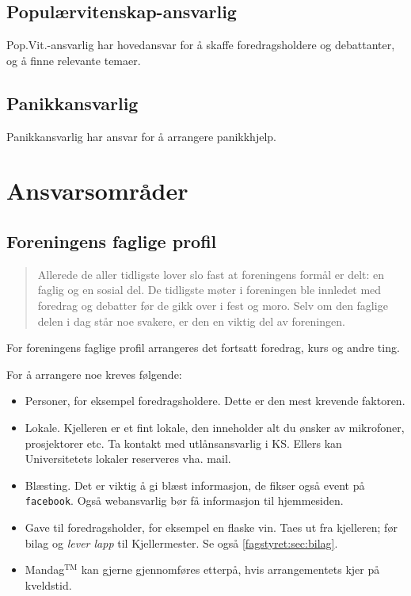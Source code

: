\subsection{Populærvitenskap-ansvarlig}
Pop.Vit.-ansvarlig har hovedansvar for å skaffe foredragsholdere og debattanter,
og å finne relevante temaer.

\subsection{Panikkansvarlig}
Panikkansvarlig har ansvar for å arrangere panikkhjelp.

\section{Ansvarsområder}
\subsection{Foreningens faglige profil}
\begin{quote}
	Allerede de aller tidligste lover slo fast at foreningens formål er delt: en
	faglig og en sosial del. De tidligste møter i foreningen ble innledet
	med foredrag og debatter før de gikk over i fest og moro. Selv om den
	faglige delen i dag står noe svakere, er den en viktig del av
	foreningen.
\end{quote}

For foreningens faglige profil arrangeres det fortsatt foredrag, kurs og andre
ting.

For å arrangere noe kreves følgende:
\begin{itemize}
	\item Personer, for eksempel foredragsholdere. Dette er den mest
	krevende faktoren.
	\item Lokale. 
          Kjelleren er et fint lokale, den inneholder alt du ønsker av
          mikrofoner, prosjektorer etc. Ta kontakt med utlånsansvarlig i KS.
          Ellers kan Universitetets lokaler reserveres vha. mail.
	\item Blæsting. Det er viktig å gi blæst informasjon, de fikser også event
          på \texttt{facebook}. Også webansvarlig bør få informasjon til
          hjemmesiden.
	\item Gave til foredragsholder, for eksempel en flaske vin. 
          Taes ut fra kjelleren; før bilag og \emph{lever lapp} til
          Kjellermester. Se også \ref{fagstyret:sec:bilag}.
	\item Mandag$^\text{TM}$ kan gjerne gjennomføres etterpå, hvis
          arrangementets kjer på kveldstid.
\end{itemize}

